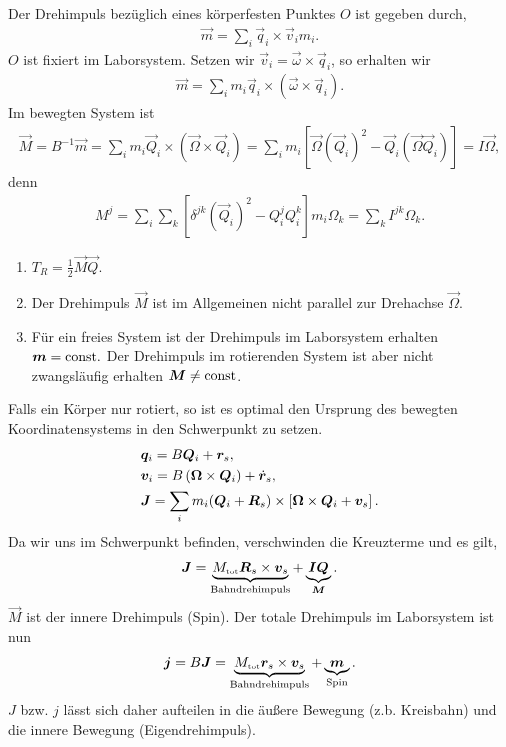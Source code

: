 Der Drehimpuls bezüglich eines körperfesten Punktes $O$ ist gegeben durch,
\begin{align*}
\vec{m} = \sum_i \vec{q}_i \times \vec{v}_i m_i.
\end{align*}
$O$ ist fixiert im Laborsystem. Setzen wir $\vec{v}_i =
\vec{\omega}\times\vec{q}_i$, so erhalten wir
\begin{align*}
\vec{m} = \sum_i m_i \vec{q}_i \times \left( \vec{\omega}\times\vec{q}_i\right).
\end{align*}
Im bewegten System ist
\begin{align*}
\vec{M} = B^{-1}\vec{m} = \sum_i m_i \vec{Q}_i \times \left(\vec{\Omega}\times
\vec{Q}_i\right) = \sum_i m_i \left[\vec{\Omega}\left(\vec{Q}_i \right)^2 -
\vec{Q}_i \left(\vec{\Omega}\vec{Q}_i\right)\right] = I\vec{\Omega},\tag{*}
\end{align*}
denn
\begin{align*}
M^j = \sum_i \sum_k \left[\delta^{jk} \left(\vec{Q}_i\right)^2 - Q_i^j Q_i^k
\right]m_i \Omega_k  = \sum_k I^{jk}\Omega_k.
\end{align*}
\begin{bemn}[Bemerkungen.]
\begin{enumerate}[label=\arabic{*}.)]
  \item $T_R = \frac{1}{2}\vec{M}\vec{Q}$.
  \item Der Drehimpuls $\vec{M}$ ist im Allgemeinen nicht parallel zur
Drehachse $\vec{\Omega}$.
\item Für ein freies System ist der Drehimpuls im Laborsystem erhalten
$\bm{m}=\mathrm{const}.$ Der Drehimpuls im rotierenden System ist aber nicht
zwangsläufig erhalten $\bm{M}\neq\mathrm{const}$.\maphere
\end{enumerate}
\end{bemn}

Falls ein Körper nur rotiert, so ist es optimal den Ursprung des bewegten
Koordinatensystems in den Schwerpunkt zu setzen.
\begin{align*}
&\bm{q}_i  = B\bm{Q}_i +\bm{r}_s,\\
&\bm{v}_i = B\left(\bm{\Omega}\times \bm{Q}_i\right)+\dot{\bm{r}}_s,\\
&\bm{J} = \sum_i m_i(\bm{Q}_i + \bm{R}_s) \times
\left[\bm{\Omega}\times \bm{Q}_i + \bm{v}_s\right].
\end{align*}
Da wir uns im Schwerpunkt befinden, verschwinden die Kreuzterme und es gilt,
\begin{align*}
\bm{J} = \underbrace{M_{\text{\tiny tot}} \bm{R}_s \times \bm{v}_s}_{\text{Bahndrehimpuls}}
+
\underbrace{\bm{I}\bm{Q}}_{\bm{M}}.
\end{align*}
$\vec{M}$ ist der innere Drehimpuls (Spin). Der totale Drehimpuls im
Laborsystem ist nun
\begin{align*}
\bm{j} = B\bm{J} = \underbrace{M_{\text{\tiny tot}} \bm{r}_s \times
\bm{v}_s}_{\text{Bahndrehimpuls}} +
\underbrace{\bm{m}}_{\text{Spin}}.
\end{align*}
$J$ bzw. $j$ lässt sich daher aufteilen in die äußere Bewegung (z.b. Kreisbahn)
und die innere Bewegung (Eigendrehimpuls).

